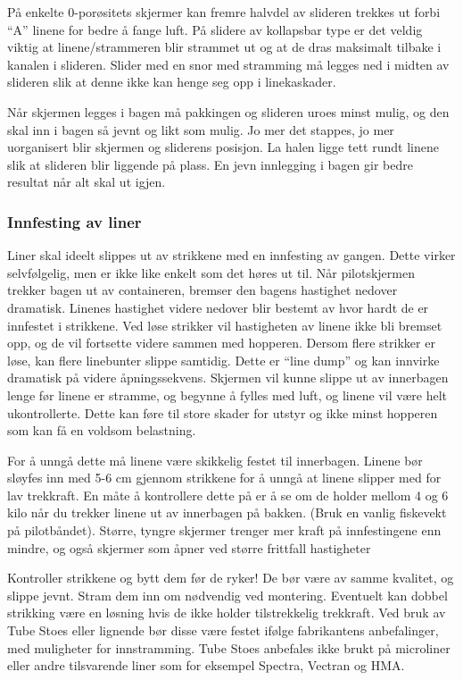 På enkelte 0-porøsitets skjermer kan fremre halvdel av slideren trekkes ut forbi ``A'' linene for bedre å fange luft. På slidere av kollapsbar type er det veldig viktig at linene/strammeren blir strammet ut og at de dras maksimalt tilbake i kanalen i slideren. Slider med en snor med stramming må legges ned i midten av slideren slik at denne ikke kan henge seg opp i linekaskader.

Når skjermen legges i bagen må pakkingen og slideren uroes minst mulig, og den skal inn i bagen så jevnt og likt som mulig. Jo mer det stappes, jo mer uorganisert blir skjermen og sliderens posisjon. La halen ligge tett rundt linene slik at slideren blir liggende på plass. En jevn innlegging i bagen gir bedre resultat når alt skal ut igjen.

\subsubsection{Innfesting av liner}
Liner skal ideelt slippes ut av strikkene med en innfesting av gangen. Dette virker selvfølgelig, men er ikke like enkelt som det høres ut til. Når pilotskjermen trekker bagen ut av containeren, bremser den bagens hastighet nedover dramatisk. Linenes hastighet videre nedover blir bestemt av hvor hardt de er innfestet i strikkene. Ved løse strikker vil hastigheten av linene ikke bli bremset opp, og de vil fortsette videre sammen med hopperen. Dersom flere strikker er løse, kan flere linebunter slippe samtidig. Dette er ``line dump'' og kan innvirke dramatisk på videre åpningssekvens. Skjermen vil kunne slippe ut av innerbagen lenge før linene er stramme, og begynne å fylles med luft, og linene vil være helt ukontrollerte. Dette kan føre til store skader for utstyr og ikke minst hopperen som kan få en voldsom belastning.

For å unngå dette må linene være skikkelig festet til innerbagen. Linene bør sløyfes inn med 5-6 cm gjennom strikkene for å unngå at linene slipper med for lav trekkraft. En måte å kontrollere dette på er å se om de holder mellom 4 og 6 kilo når du trekker linene ut av innerbagen på bakken. (Bruk en vanlig fiskevekt på pilotbåndet). Større, tyngre skjermer trenger mer kraft på innfestingene enn mindre, og også skjermer som åpner ved større frittfall hastigheter

Kontroller strikkene og bytt dem før de ryker! De bør være av samme kvalitet, og slippe jevnt. Stram dem inn om nødvendig ved montering. Eventuelt kan dobbel strikking være en løsning hvis de ikke holder tilstrekkelig trekkraft. Ved bruk av Tube Stoes eller lignende bør disse være festet ifølge fabrikantens anbefalinger, med muligheter for innstramming. Tube Stoes anbefales ikke brukt på microliner eller andre tilsvarende liner som for eksempel Spectra, Vectran og HMA.

